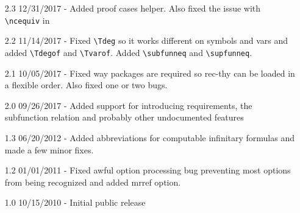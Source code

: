 \documentclass[leqno,11pt]{amsart}
\begin{document}
\begin{itemize}
	\item[2.3] 12/31/2017 - Added proof cases helper.  Also fixed the issue with \verb=\ncequiv= in \XeLaTeX
	\item[2.2] 11/14/2017 - Fixed \verb=\Tdeg= so it works different on symbols and vars and added \verb=\Tdegof= and \verb=\Tvarof=.  Added \verb=\subfunneq= and \verb=\supfunneq=.
	\item[2.1] 10/05/2017 - Fixed way packages are required so rec-thy can be loaded in a flexible order.  Also fixed one or two bugs.
	\item[2.0] 09/26/2017 - Added support for introducing requirements, the subfunction relation and probably other undocumented features
	\item[1.3] 06/20/2012 - Added abbreviations for computable infinitary formulas and made a few minor fixes.
	\item[1.2] 01/01/2011 - Fixed awful option processing bug preventing most options from being recognized and added mrref option.
	\item[1.0] 10/15/2010 - Initial public release
\end{itemize}
\end{document}
